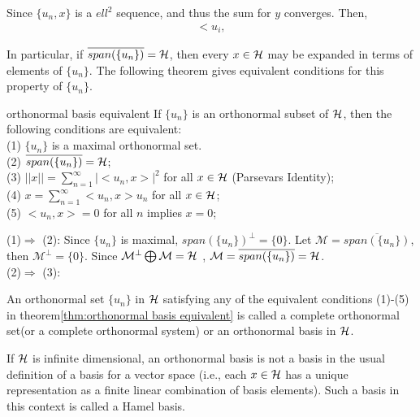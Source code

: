 \begin{proofsolution}
    Since $\{u_n,x\}$ is a $ell^2$ sequence, and thus the sum for $y$ converges. Then,
    \begin{align*}
        <u_i,
    \end{align*}
\end{proofsolution}

In particular, if $\overline{span(\{u_n\})}=\mathcal{H}$, then every $x\in \mathcal{H}$ may be expanded in terms of elements of $\{u_n\}$. The following theorem gives equivalent conditions for this property of $\{u_n\}$.

\begin{theorem}{}{orthonormal basis equivalent}
    If $\{u_n\}$ is an orthonormal subset of $\mathcal{H}$, then the following conditions are equivalent:\\
    (1) $\{u_n\}$ is a maximal orthonormal set.\\
    (2) $\overline{span(\{u_n\})}=\mathcal{H}$;\\
    (3) $||x||=\sum\limits_{n=1}^{\infty}|<u_n,x>|^2$ for all $x\in\mathcal{H}$ (Parsevars Identity);\\
    (4) $x=\sum\limits_{n=1}^{\infty}<u_n,x>u_n$ for all $x\in \mathcal{H}$;\\
    (5) $<u_n,x>=0$ for all $n$ implies $x=0$;
\end{theorem}
\begin{proofsolution}
    (1)$\Rightarrow$ (2): Since $\{u_n\}$ is maximal, $span(\{u_n\})^{\perp} = \{0\}$. 
    Let $\mathcal{M} = \overline{span(\{u_n\})}$, then $\mathcal{M}^{\perp}=\{0\}$. Since $\mathcal{M}^{\perp}\bigoplus \mathcal{M} = \mathcal{H}$ , $\mathcal{M} = \overline{span(\{u_n\})}=\mathcal{H}$.
    \\
    (2)$\Rightarrow$ (3): 
\end{proofsolution}


\begin{definition}{}{}
    An orthonormal set $\{u_n\}$ in $\mathcal{H}$ satisfying any of the equivalent conditions (1)-(5) in theorem\ref{thm:orthonormal basis equivalent} 
    is called a complete orthonormal set(or a complete orthonormal system) or an orthonormal basis in $\mathcal{H}$. 
\end{definition}

\begin{remark}
    If $\mathcal{H}$ is infinite dimensional, an orthonormal basis is not a basis in the usual
    definition of a basis for a vector space (i.e., each $x\in\mathcal{H}$ has a unique representation as a
    finite linear combination of basis elements). Such a basis in this context is called a Hamel
    basis.
\end{remark}

